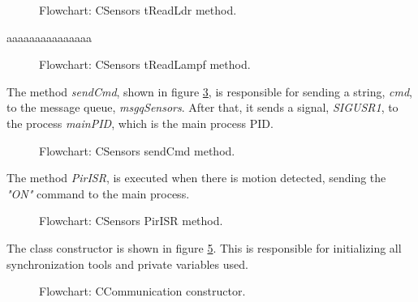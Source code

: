 \begin{figure}[H]
	\centering
	\caption{Flowchart: CSensors tReadLdr method.}
	\label{fig:CSensorstreadldr}
\end{figure}

aaaaaaaaaaaaaaa

\begin{figure}[H]
	\centering
	\caption{Flowchart: CSensors tReadLampf method.}
	\label{fig:CSensorstreadlampf}
\end{figure}

The method \textit{sendCmd}, shown in figure \ref{fig:CSensorssendcmd}, is responsible for sending a string, \textit{cmd}, to the message queue, \textit{msgqSensors}. After that, it sends a signal, \textit{SIGUSR1}, to the process \textit{mainPID}, which is the main process PID.

\begin{figure}[H]
	\centering
	\caption{Flowchart: CSensors sendCmd method.}
	\label{fig:CSensorssendcmd}
\end{figure}

The method \textit{PirISR}, is executed when there is motion detected, sending the \textit{"ON"} command to the main process.

\begin{figure}[H]
	\centering
	\caption{Flowchart: CSensors PirISR method.}
	\label{fig:CSensorspirisr}
\end{figure}

\clearpage
{}

The class constructor is shown in figure \ref{fig:CCommunicationConstructor}. This is responsible for initializing all synchronization tools and private variables used.

\begin{figure}[H]
	\centering
	\caption{Flowchart: CCommunication constructor.}
	\label{fig:CCommunicationConstructor}
\end{figure}


